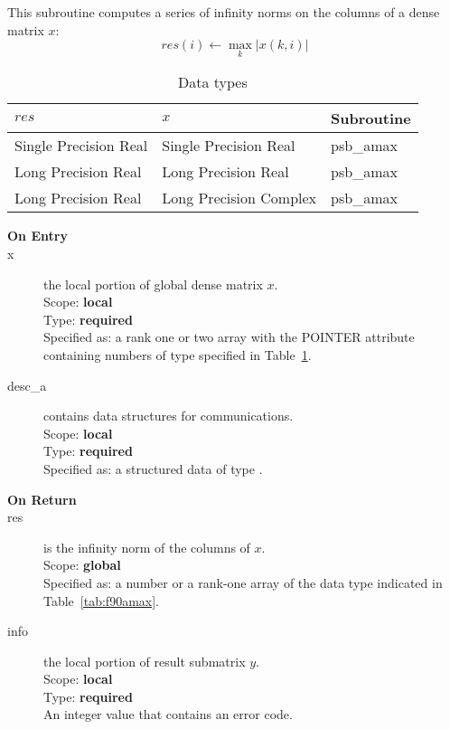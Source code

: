 
This subroutine computes a series of  infinity norms on the columns of
a  dense matrix  $x$: 
\[ res(i) \leftarrow \max_k |x(k,i)| \]

\begin{table}[h]
\begin{center}
\begin{tabular}{lll}
\hline
$res$&  $x$& {\bf Subroutine}\\
\hline
Single Precision Real  &Single Precision Real  & psb\_amax\\
Long Precision Real    &Long Precision Real    & psb\_amax\\
Long Precision Real &Long Precision Complex & psb\_amax\\	
\hline
\end{tabular}
\end{center}
\caption{Data types\label{tab:f90mamax}}
\end{table}

\begin{description}
\item[\bf On Entry]
\item[x] the local portion of global dense matrix
$x$. \\
Scope: {\bf local} \\
Type: {\bf required} \\
Specified as: a rank one or two array with the POINTER attribute
containing numbers of type specified in
Table~\ref{tab:f90mamax}. 
\item[desc\_a] contains data structures for communications.\\
Scope: {\bf local} \\
Type: {\bf required}\\
Specified as: a structured data of type \descdata.
\item[\bf On Return] 
\item[res] is the infinity norm of the columns of $x$.\\
Scope: {\bf global} \\
Specified as: a number or a rank-one array  of the data type indicated
in Table~\ref{tab:f90amax}. 
\item[info] the local portion of result submatrix $y$.\\
Scope: {\bf local} \\
Type: {\bf required} \\
An integer value that contains an error code. 
\end{description}

